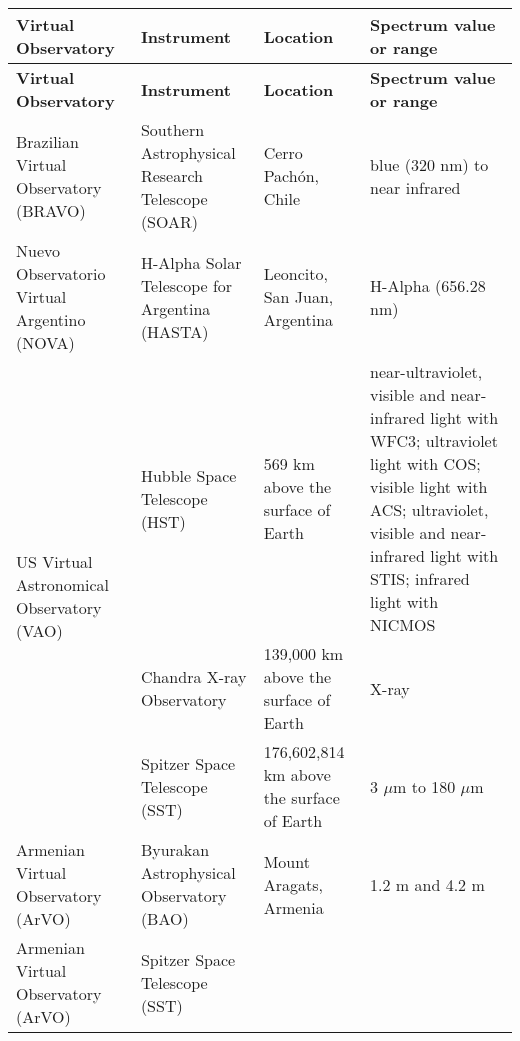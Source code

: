 \begin{center}  
\begin{longtable}{|m{3cm}|m{3cm}|m{3cm}|m{5cm}|}
    \hline                                                                      
    \textbf{Virtual Observatory} & \textbf{Instrument} & \textbf{Location} &
    \textbf{Spectrum value or range} \\
    \hline                                                                      
    \endfirsthead
    \hline                                                                      
    \textbf{Virtual Observatory} & \textbf{Instrument} & \textbf{Location} &
    \textbf{Spectrum value or range} \\
    \hline                                                                      
    \endhead
    Brazilian Virtual Observatory (BRAVO) & Southern Astrophysical Research
    Telescope (SOAR) & Cerro Pach\'{o}n, Chile & blue (320 nm) to near infrared
    \cite{website:SOAR_EMS} \\
    \hline                                                                      
    Nuevo Observatorio Virtual Argentino (NOVA) & H-Alpha Solar Telescope for
    Argentina (HASTA) & Leoncito, San Juan, Argentina & H-Alpha (656.28 nm)
    \cite{website:HASTA_EMS} \\
    \hline
    \multirow{3}{3cm}{US Virtual Astronomical Observatory (VAO)} & Hubble Space
    Telescope (HST) & 569 km above the surface of Earth & near-ultraviolet,
    visible and near-infrared light with WFC3; ultraviolet light with COS;
    visible light with ACS; ultraviolet, visible and near-infrared light with
    STIS; infrared light with NICMOS \cite{website:HST_EMS} \\
     \cline{2-4}
     & Chandra X-ray Observatory & 139,000 km above the surface of Earth & X-ray
     \cite{website:Chandra_EMS} \\
     \cline{2-4}
     & Spitzer Space Telescope (SST) & 176,602,814 km above the surface of Earth
     \cite{website:SST_EMS_1} & 3 $ \mu $m to 180 $ \mu $m
     \cite{website:SST_EMS_2} \\
    \hline
    Armenian Virtual Observatory (ArVO) & Byurakan Astrophysical Observatory
    (BAO) & Mount Aragats, Armenia & 1.2 m and 4.2 m \cite{website:BAO_EMS} \\
    \hline
    Armenian Virtual Observatory (ArVO) & Spitzer Space Telescope (SST) &

\end{longtable}
\end{center}
